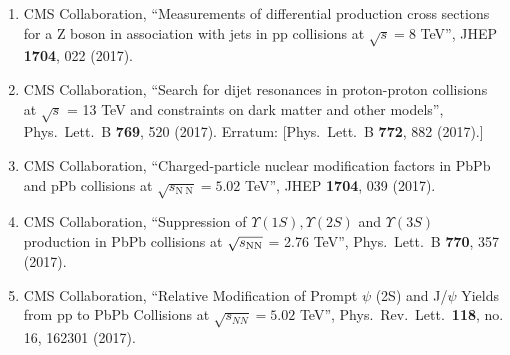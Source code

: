 \begin{enumerate}
\item CMS Collaboration, ``Measurements of differential production cross sections for a Z boson in association with jets in pp collisions at $ \sqrt{s}=8 $ TeV'', JHEP {\bf 1704}, 022 (2017).

\item CMS Collaboration, ``Search for dijet resonances in proton-proton collisions at $\sqrt{s}$ = 13 TeV and constraints on dark matter and other models'', Phys.\ Lett.\ B {\bf 769}, 520 (2017).
  Erratum: [Phys.\ Lett.\ B {\bf 772}, 882 (2017).]

\item CMS Collaboration, ``Charged-particle nuclear modification factors in PbPb and pPb collisions at $ \sqrt{s_{\mathrm{N}\;\mathrm{N}}}=5.02 $ TeV'', JHEP {\bf 1704}, 039 (2017).

\item CMS Collaboration, ``Suppression of $\Upsilon(1S), \Upsilon(2S)$ and $\Upsilon(3S)$ production in PbPb collisions at $\sqrt{s_{\rm NN}}$ = 2.76 TeV'', Phys.\ Lett.\ B {\bf 770}, 357 (2017).

\item CMS Collaboration, ``Relative Modification of Prompt $\psi$ (2S) and J/$\psi$ Yields from pp to PbPb Collisions at $\sqrt{s_{NN}}=5.02$ TeV'', Phys.\ Rev.\ Lett.\  {\bf 118}, no. 16, 162301 (2017).


\end{enumerate}
